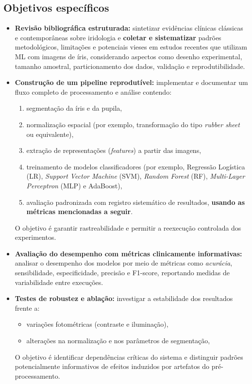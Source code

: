 \documentclass[11pt,a4paper]{article}
\begin{document}
\subsection{Objetivos específicos}
\begin{itemize}
    \item \textbf{Revisão bibliográfica estruturada:} sintetizar evidências clínicas clássicas e contemporâneas sobre iridologia e \textbf{coletar e sistematizar} padrões metodológicos, limitações e potenciais vieses em estudos recentes que utilizam ML com imagens de íris, considerando aspectos como desenho experimental, tamanho amostral, particionamento dos dados, validação e reprodutibilidade.

    \item \textbf{Construção de um pipeline reprodutível:} implementar e documentar um fluxo completo de processamento e análise contendo:
    \begin{enumerate}
        \item segmentação da íris e da pupila,
        \item normalização espacial (por exemplo, transformação do tipo \textit{rubber sheet} ou equivalente),
        \item extração de representações (\textit{features}) a partir das imagens,
        \item treinamento de modelos classificadores (por exemplo, Regressão Logística (LR), \textit{Support Vector Machine} (SVM), \textit{Random Forest} (RF), \textit{Multi-Layer Perceptron} (MLP) e AdaBoost),
        \item avaliação padronizada com registro sistemático de resultados, \textbf{usando as métricas mencionadas a seguir}.
    \end{enumerate}
    O objetivo é garantir rastreabilidade e permitir a reexecução controlada dos experimentos.

    \item \textbf{Avaliação do desempenho com métricas clinicamente informativas:} analisar o desempenho dos modelos por meio de métricas como \textit{acurácia}, sensibilidade, especificidade, precisão e F1-score, reportando medidas de variabilidade entre execuções.

    \item \textbf{Testes de robustez e ablação:} investigar a estabilidade dos resultados frente a:
    \begin{itemize}
        \item variações fotométricas (contraste e iluminação),
        \item alterações na normalização e nos parâmetros de segmentação,
    \end{itemize}
    O objetivo é identificar dependências críticas do sistema e distinguir padrões potencialmente informativos de efeitos induzidos por artefatos do pré-processamento.
\end{itemize}
\end{document}
